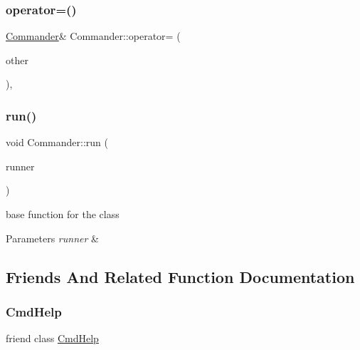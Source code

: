 \subsubsection{\texorpdfstring{operator=()}{operator=()}}
{\footnotesize\ttfamily \hyperlink{classCommander}{Commander}\& Commander\+::operator= (\begin{DoxyParamCaption}\item[{\hyperlink{classCommander}{Commander} const \&}]{other }\end{DoxyParamCaption})\hspace{0.3cm}{\ttfamily [private]}, {\ttfamily [delete]}}

\mbox{\label{classCommander_afea1bfe2bc8dbeea0d0523f369c9539e}} 
\subsubsection{\texorpdfstring{run()}{run()}}
{\footnotesize\ttfamily void Commander\+::run (\begin{DoxyParamCaption}\item[{\hyperlink{Command_8hpp_a3594ceaf3c835811a9a67810e7af19f9}{Runner\+Type} \&}]{runner }\end{DoxyParamCaption})\hspace{0.3cm}{\ttfamily [static]}}

base function for the class 
\begin{DoxyParams}{Parameters}
{\em runner} & \\
\hline
\end{DoxyParams}


\subsection{Friends And Related Function Documentation}
\mbox{\label{classCommander_aaf5700242631ebac67a8b2f6eaf9c730}} 
\subsubsection{\texorpdfstring{Cmd\+Help}{CmdHelp}}
{\footnotesize\ttfamily friend class \hyperlink{classCmdHelp}{Cmd\+Help}\hspace{0.3cm}{\ttfamily [friend]}}



